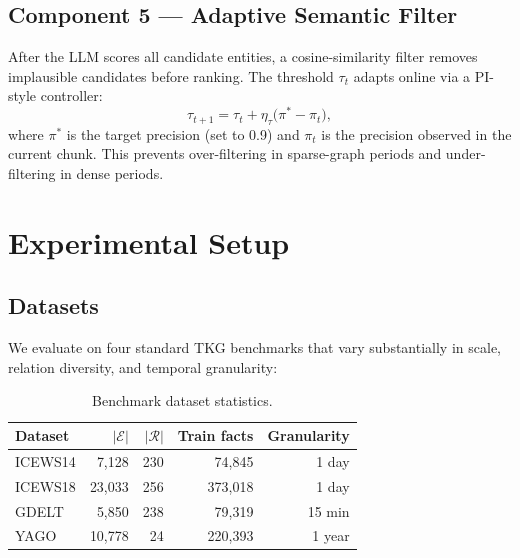 \documentclass[10pt,a4paper,twocolumn]{article}
\theoremstyle{definition}
\newcommand{\calE}{\mathcal{E}}
\newcommand{\calR}{\mathcal{R}}
\begin{document}
\subsection{Component 5 — Adaptive Semantic Filter}
\label{sec:filter}

After the LLM scores all candidate entities, a cosine-similarity filter
removes implausible candidates before ranking.
The threshold $\tau_t$ adapts online via a PI-style controller:
\begin{equation}
  \tau_{t+1} = \tau_t + \eta_\tau\bigl(\pi^* - \pi_t\bigr),
\end{equation}
where $\pi^*$ is the target precision (set to 0.9) and $\pi_t$ is the
precision observed in the current chunk.
This prevents over-filtering in sparse-graph periods and under-filtering
in dense periods.

\section{Experimental Setup}
\label{sec:setup}

\subsection{Datasets}

We evaluate on four standard TKG benchmarks that vary substantially in
scale, relation diversity, and temporal granularity:

\begin{table}[h!]
\centering
\caption{Benchmark dataset statistics.}
\label{tab:datasets}
\scriptsize
\renewcommand{\arraystretch}{1.25}
\begin{tabular}{lrrrr}
\toprule
\textbf{Dataset} & \textbf{$|\calE|$} & \textbf{$|\calR|$}
                 & \textbf{Train facts} & \textbf{Granularity} \\
\midrule
ICEWS14 \cite{Boschee2015icews}
        & 7,128  & 230 &  74,845 & 1 day     \\
ICEWS18 \cite{Boschee2015icews}
        & 23,033 & 256 & 373,018 & 1 day     \\
GDELT \cite{Leetaru2013gdelt}
        & 5,850  & 238 &  79,319 & 15 min    \\
YAGO \cite{Mahdisoltani2015yago}
        & 10,778 & 24  & 220,393 & 1 year    \\
\bottomrule
\end{tabular}
\end{table}
\end{document}
